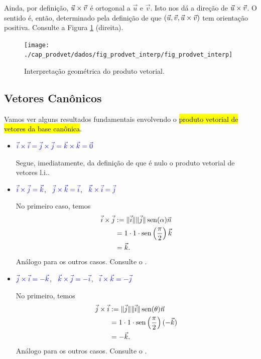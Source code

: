 Ainda, por definição, $\vec{u}\times\vec{v}$ é ortogonal a $\vec{u}$ e $\vec{v}$. Isto nos dá a direção de $\vec{u}\times\vec{v}$. O sentido é, então, determinado pela definição de que $(\vec{u},\vec{v},\vec{u}\times\vec{v})$ tem orientação positiva. Consulte a Figura \ref{fig:prodvet_interp} (direita).

\begin{figure}[H]
  \centering
  \texttt{[image: ./cap\_prodvet/dados/fig\_prodvet\_interp/fig\_prodvet\_interp]}
  \caption{Interpretação geométrica do produto vetorial.}
  \label{fig:prodvet_interp}
\end{figure}

\subsection{Vetores Canônicos}

Vamos ver alguns resultados fundamentais envolvendo o \hl{produto vetorial de vetores da base canônica}.

\begin{itemize}
  \item $\color{blue}\vec{i}\times\vec{i}=\vec{j}\times\vec{j}=\vec{k}\times\vec{k}=\vec{0}$
  
  Segue, imediatamente, da definição de que é nulo o produto vetorial de vetores l.i..

  \item $\color{blue}\vec{i}\times\vec{j}=\vec{k}$, ~$\color{blue}\vec{j}\times\vec{k}=\vec{i}$, ~$\color{blue}\vec{k}\times\vec{i}=\vec{j}$
  
  No primeiro caso, temos
  \begin{align}
    \vec{i}\times\vec{j} &:= \|\vec{i}\|\|\vec{j}\|\operatorname{sen}(\alpha)\vec{n}\\
    &= 1\cdot 1\cdot\operatorname{sen}\left(\frac{\pi}{2}\right)\vec{k}\\
    &= \vec{k}.
  \end{align}
  Análogo para os outros casos. Consulte o .

  \item $\color{blue}\vec{j}\times\vec{i}=-\vec{k}$, ~$\color{blue}\vec{k}\times\vec{j}=-\vec{i}$, ~$\color{blue}\vec{i}\times\vec{k}=-\vec{j}$
  
  No primeiro, temos
  \begin{align}
    \vec{j}\times\vec{i} &:= \|\vec{j}\|\|\vec{i}\|\operatorname{sen}(\theta)\vec{n}\\
    &= 1\cdot 1\cdot\operatorname{sen}\left(\frac{\pi}{2}\right)(-\vec{k})\\
    &= -\vec{k}.
  \end{align}
  Análogo para os outros casos. Consulte o .
\end{itemize}

